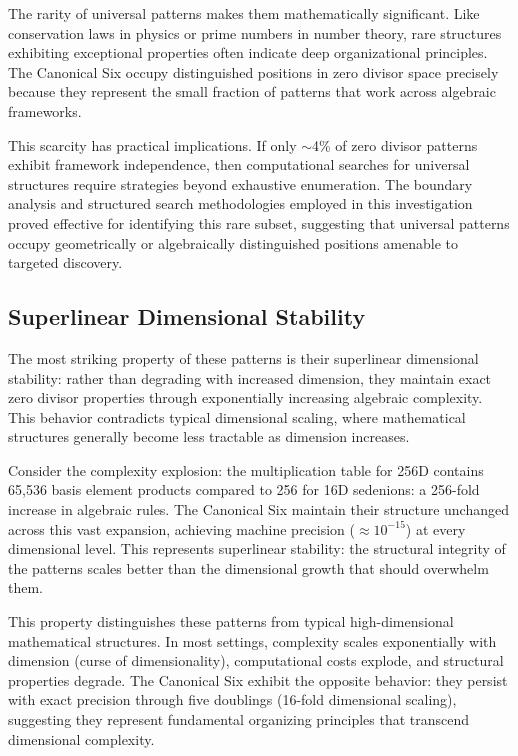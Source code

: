 \documentclass[11pt]{article}
\begin{document}
The rarity of universal patterns makes them mathematically significant. Like conservation laws in physics or prime numbers in number theory, rare structures exhibiting exceptional properties often indicate deep organizational principles. The Canonical Six occupy distinguished positions in zero divisor space precisely because they represent the small fraction of patterns that work across algebraic frameworks.

This scarcity has practical implications. If only $\sim$4\% of zero divisor patterns exhibit framework independence, then computational searches for universal structures require strategies beyond exhaustive enumeration. The boundary analysis and structured search methodologies employed in this investigation proved effective for identifying this rare subset, suggesting that universal patterns occupy geometrically or algebraically distinguished positions amenable to targeted discovery.

\subsection{Superlinear Dimensional Stability}

The most striking property of these patterns is their superlinear dimensional stability: rather than degrading with increased dimension, they maintain exact zero divisor properties through exponentially increasing algebraic complexity. This behavior contradicts typical dimensional scaling, where mathematical structures generally become less tractable as dimension increases.

Consider the complexity explosion: the multiplication table for 256D contains 65,536 basis element products compared to 256 for 16D sedenions: a 256-fold increase in algebraic rules. The Canonical Six maintain their structure unchanged across this vast expansion, achieving machine precision ($\approx 10^{-15}$) at every dimensional level. This represents superlinear stability: the structural integrity of the patterns scales better than the dimensional growth that should overwhelm them.

This property distinguishes these patterns from typical high-dimensional mathematical structures. In most settings, complexity scales exponentially with dimension (curse of dimensionality), computational costs explode, and structural properties degrade. The Canonical Six exhibit the opposite behavior: they persist with exact precision through five doublings (16-fold dimensional scaling), suggesting they represent fundamental organizing principles that transcend dimensional complexity.
\end{document}
